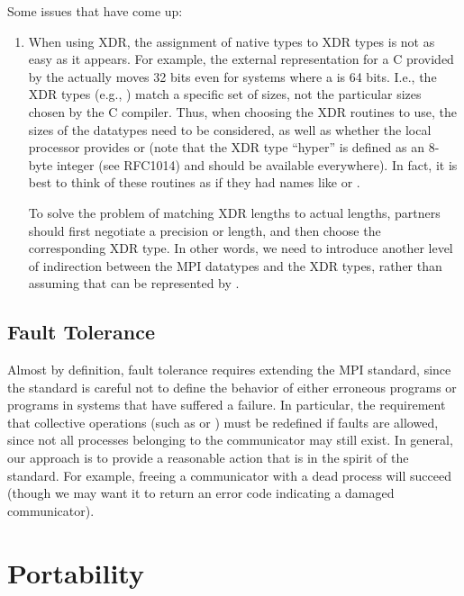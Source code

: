 \documentclass{article}
\begin{document}
Some issues that have come up:
\begin{enumerate}
\item When using XDR, the assignment of native types to XDR types
  is not as easy as it appears.  For example, the external representation for
  a C  provided by the  actually moves 32 bits
  even for systems where a  is 64 bits.  I.e., the XDR types (e.g.,
  ) match a specific set of sizes, not the particular sizes
  chosen by the C compiler.  Thus, when choosing the XDR routines to use, the
  sizes of the datatypes need to be considered, as well as whether the local
  processor provides  or  (note that the
  XDR type ``hyper'' is defined as an 8-byte integer (see RFC1014) and should
  be available everywhere).  In fact, it is best to think of these
  routines as if they had names like  or .

  To solve the problem of matching XDR lengths to actual lengths,
  partners should first negotiate a precision or length, and then
  choose the corresponding XDR type.  In other words, we need to
  introduce another level of indirection between the MPI datatypes and
  the XDR types, rather than assuming that  can be
  represented by .  

\end{enumerate}

\subsection{Fault Tolerance}
Almost by definition, fault tolerance requires extending the MPI
standard, since the standard is careful not to define the behavior of
either erroneous programs or programs in systems that have suffered a
failure.  In particular, the requirement that collective operations
(such as  or ) must be
redefined if faults are allowed, since not all processes belonging to
the communicator may still exist.  In general, our approach is to
provide a reasonable action that is in the spirit of the standard.
For example, freeing a communicator with a dead process will succeed
(though we may want it to return an error code indicating a damaged
communicator).  

\section{Portability}
\label{sec:portability}
\end{document}
